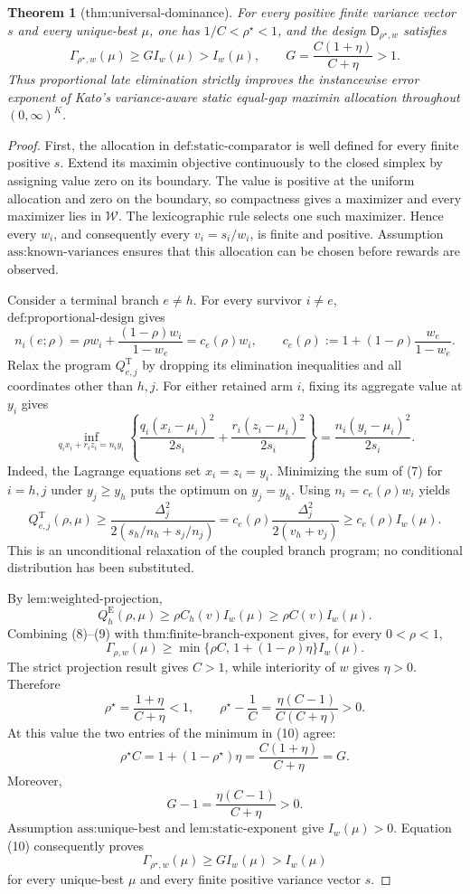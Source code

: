 \documentclass{article}
\newtheorem{theorem}{Theorem}
\begin{document}
\begin{theorem}[thm:universal-dominance]\label{thm:universal-dominance}
For every positive finite variance vector \(s\) and every unique-best \(\mu\), one has \(1/C<\rho^\star<1\), and the design \(\mathsf D_{\rho^\star,w}\) satisfies \[\Gamma_{\rho^\star,w}(\mu)\ge G I_w(\mu)>I_w(\mu),\qquad G=\frac{C(1+\eta)}{C+\eta}>1.\] Thus proportional late elimination strictly improves the instancewise error exponent of Kato's variance-aware static equal-gap maximin allocation throughout \((0,\infty)^K\).
\end{theorem}
\begin{proof}
First, the allocation in \(\text{def:static-comparator}\) is well defined for every finite positive \(s\). Extend its maximin objective continuously to the closed simplex by assigning value zero on its boundary. The value is positive at the uniform allocation and zero on the boundary, so compactness gives a maximizer and every maximizer lies in \(\mathcal W\). The lexicographic rule selects one such maximizer. Hence every \(w_i\), and consequently every \(v_i=s_i/w_i\), is finite and positive. Assumption \(\text{ass:known-variances}\) ensures that this allocation can be chosen before rewards are observed.

Consider a terminal branch \(e\ne h\). For every survivor \(i\ne e\), \(\text{def:proportional-design}\) gives
\[
 n_i(e;\rho)=\rho w_i+\frac{(1-\rho)w_i}{1-w_e}
 =c_e(\rho)w_i,
 \qquad
 c_e(\rho):=1+(1-\rho)\frac{w_e}{1-w_e}. \tag{6}
\]
Relax the program \(Q_{e,j}^{\mathrm T}\) by dropping its elimination inequalities and all coordinates other than \(h,j\). For either retained arm \(i\), fixing its aggregate value at \(y_i\) gives
\[
 \inf_{q_i x_i+r_i z_i=n_i y_i}
 \left\{\frac{q_i(x_i-\mu_i)^2}{2s_i}
 +\frac{r_i(z_i-\mu_i)^2}{2s_i}\right\}
 =\frac{n_i(y_i-\mu_i)^2}{2s_i}. \tag{7}
\]
Indeed, the Lagrange equations set \(x_i=z_i=y_i\). Minimizing the sum of (7) for \(i=h,j\) under \(y_j\geq y_h\) puts the optimum on \(y_j=y_h\). Using \(n_i=c_e(\rho)w_i\) yields
\[
 Q_{e,j}^{\mathrm T}(\rho,\mu)
 \geq \frac{\Delta_j^2}{2(s_h/n_h+s_j/n_j)}
 =c_e(\rho)\frac{\Delta_j^2}{2(v_h+v_j)}
 \geq c_e(\rho)I_w(\mu). \tag{8}
\]
This is an unconditional relaxation of the coupled branch program; no conditional distribution has been substituted.

By \(\text{lem:weighted-projection}\),
\[
 Q_h^{\mathrm E}(\rho,\mu)
 \geq \rho C_h(v)I_w(\mu)
 \geq \rho C(v)I_w(\mu). \tag{9}
\]
Combining (8)--(9) with \(\text{thm:finite-branch-exponent}\) gives, for every \(0<\rho<1\),
\[
 \Gamma_{\rho,w}(\mu)
 \geq \min\{\rho C,\,1+(1-\rho)\eta\}I_w(\mu). \tag{10}
\]
The strict projection result gives \(C>1\), while interiority of \(w\) gives \(\eta>0\). Therefore
\[
 \rho^\star=\frac{1+\eta}{C+\eta}<1,
 \qquad
 \rho^\star-\frac1C
 =\frac{\eta(C-1)}{C(C+\eta)}>0.
\]
At this value the two entries of the minimum in (10) agree:
\[
 \rho^\star C=1+(1-\rho^\star)\eta
 =\frac{C(1+\eta)}{C+\eta}=G.
\]
Moreover,
\[
 G-1=\frac{\eta(C-1)}{C+\eta}>0.
\]
Assumption \(\text{ass:unique-best}\) and \(\text{lem:static-exponent}\) give \(I_w(\mu)>0\). Equation (10) consequently proves
\[
 \Gamma_{\rho^\star,w}(\mu)\geq G I_w(\mu)>I_w(\mu)
\]
for every unique-best \(\mu\) and every finite positive variance vector \(s\).
\end{proof}
\end{document}
